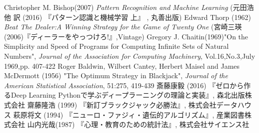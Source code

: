 \begin{thebibliography}{9}
   Christopher M. Bishop(2007) {\it{Pattern Recognition and Machine Learning}} (元田浩 他 訳 (2016) 『パターン認識と機械学習 上』 , 丸善出版)
   Edward Thorp (1962) {\it{Beat The Dealer:A Winning Strategy for the Game of Twenty One}} (宮崎三瑛(2006)『ディーラーをやっつけろ!』,Vintage)
   Gregory J. Chaitin(1969)"On the Simplicity and Speed of Programs for Computing Infinite Sets of Natural Numbers", {\it{Journal of the Association for Computing Machinery}}, Vol.16,No.3,July 1969,pp. 407-422
   Roger Baldwin, Wilbert Cantey, Herbert Maisel and James McDermott (1956) "The Optimum Strategy in Blackjack", {\it{Journal of the American Statistical Association}}, 51:275, 419-439
   斎藤康毅 (2016) 『ゼロから作るDeep Learning Pythonで学ぶディープラーニングの理論と実装』, 森北出版株式会社
   齋藤隆浩 (1999) 『新訂ブラックジャック必勝法』, 株式会社データハウス
   萩原将文 (1994) 『ニューロ・ファジィ・遺伝的アルゴリズム』, 産業図書株式会社
   山内光哉(1987) 『心理・教育のための統計法』, 株式会社サイエンス社
\end{thebibliography}
